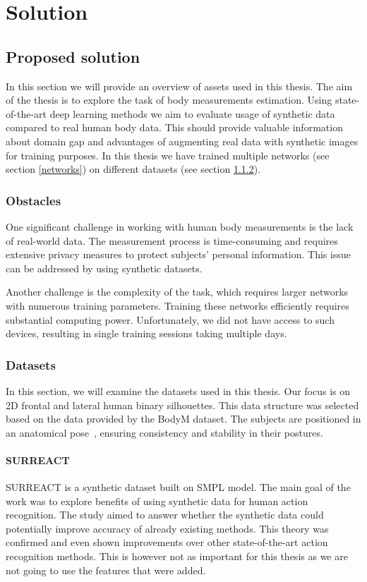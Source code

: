 \chapter{Solution}

\section{Proposed solution}
In this section we will provide an overview of assets used in this thesis. The aim of the thesis is to explore the task of body measurements estimation. Using state-of-the-art deep learning methods we aim to evaluate usage of synthetic data compared to real human body data. This should provide valuable information about domain gap and advantages of augmenting real data with synthetic images for training purposes. In this thesis we have trained multiple networks (see section \ref{networks}) on different datasets (see section \ref{datasets}).

\subsection{Obstacles}

One significant challenge in working with human body measurements is the lack of real-world data. The measurement process is time-consuming and requires extensive privacy measures to protect subjects' personal information. This issue can be addressed by using synthetic datasets.

Another challenge is the complexity of the task, which requires larger networks with numerous training parameters. Training these networks efficiently requires substantial computing power. Unfortunately, we did not have access to such devices, resulting in single training sessions taking multiple days.


\subsection{Datasets}
\label{datasets}
In this section, we will examine the datasets used in this thesis. Our focus is on 2D frontal and lateral human binary silhouettes. This data structure was selected based on the data provided by the BodyM dataset. The subjects are positioned in an anatomical pose~\cite{apose}, ensuring consistency and stability in their postures.

\subsubsection{SURREACT}
SURREACT \cite{surreact} is a synthetic dataset built on SMPL model. The main goal of the work was to explore benefits of using synthetic data for  human action recognition.  The study aimed to answer whether the synthetic data could potentially improve accuracy of already existing methods. This theory was confirmed and even shown improvements over other state-of-the-art action recognition methods. This is however not as important for this thesis as we are not going to use the features that were added.


